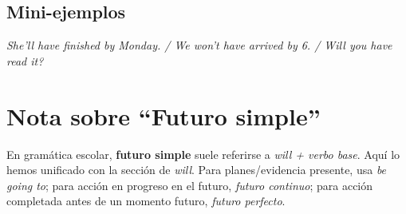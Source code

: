 \documentclass[11pt,a4paper]{article}
\begin{document}
\subsection*{Mini-ejemplos}
\emph{She’ll have finished by Monday. / We won’t have arrived by 6. / Will you have read it?}

\section{Nota sobre ``Futuro simple''}
En gramática escolar, \textbf{futuro simple} suele referirse a \emph{will + verbo base}. Aquí lo hemos unificado con la sección de \emph{will}. Para planes/evidencia presente, usa \emph{be going to}; para acción en progreso en el futuro, \emph{futuro continuo}; para acción completada antes de un momento futuro, \emph{futuro perfecto}.

\end{document}

